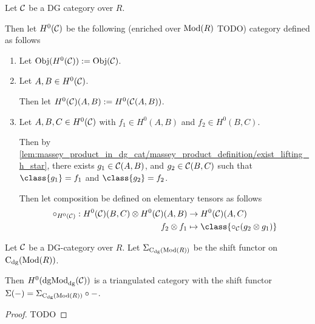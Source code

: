 
\begin{definition}
    Let \( {\mathcal{C}} \) be a DG category over \( R \).

    Then let \( H^0({\mathcal{C}}) \) be the following (enriched over \( \operatorname{Mod}(R) \) TODO) category defined as follows
    \begin{enumerate}
        \item {
            Let \( \operatorname{Obj}(H^0({\mathcal{C}})) := \operatorname{Obj}({\mathcal{C}}) \).
        }
        \item {
            Let \( A, B \in H^0({\mathcal{C}}) \).

            Then let \( H^0({\mathcal{C}})(A, B) := H^0({\mathcal{C}}(A, B)) \).
        }
        \item {
            Let \( A, B, C \in H^0({\mathcal{C}}) \) with \( f_1 \in H^0(A, B) \) and \( f_2 \in H^0(B, C) \).

            Then by \autoref{lem:massey_product_in_dg_cat/massey_product_definition/exist_lifting_h_star}, there exists \( g_1 \in {\mathcal{C}}(A, B) \), and \( g_2 \in {\mathcal{C}}(B, C) \) such that \( \class{g_1} = f_1 \) and \( \class{g_2} = f_2 \).

            Then let composition be defined on elementary tensors as follows
            \begin{align*}
                \circ_{H^0(\Cc)}: H^0(\Cc)(B, C) \otimes H^0(\Cc)(A, B) &\to H^0(\Cc)(A, C) \\
                f_2 \otimes f_1 &\mapsto \class{ \circ_{\Cc}(g_2 \otimes g_1) }
            \end{align*}
        }
    \end{enumerate}
\end{definition}

\begin{theorem}
    Let \( {\mathcal{C}} \) be a DG-category over \( R \). Let \( \Sigma_{\operatorname{C}_{\operatorname{dg}}(\operatorname{Mod}(R))} \) be the shift functor on \( \operatorname{C}_{\operatorname{dg}}(\operatorname{Mod}(R)) \).

    Then \( H^0(\operatorname{dgMod}_{\operatorname{dg}}({\mathcal{C}})) \) is a triangulated category with the shift functor \( \Sigma(-) = \Sigma_{\operatorname{C}_{\operatorname{dg}}(\operatorname{Mod}(R))} \circ - \).
\end{theorem}
\begin{proof}
    TODO
\end{proof}

